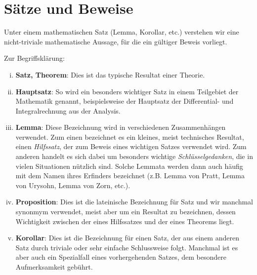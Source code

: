 \section{Sätze und Beweise}

Unter einem mathematischen Satz (Lemma, Korollar, etc.) verstehen wir eine nicht-triviale mathematische Aussage, für die ein gültiger Beweis vorliegt.

\begin{remark}
    Zur Begriffsklärung: 
    \begin{enumerate}[(i)]
        \item
        \textbf{Satz, Theorem}: Dies ist das typische Resultat einer Theorie.
        \item
        \textbf{Hauptsatz}: So wird ein besonders wichtiger Satz in einem Teilgebiet der Mathematik
        genannt, beispielsweise der Hauptsatz der Differential- und Integralrechnung aus der Analysis.
        \item
        \textbf{Lemma}:
        Diese Bezeichnung wird in verschiedenen Zusammenhängen verwendet. Zum einen bezeichnet es
        ein kleines, meist technisches Resultat, einen \textit{Hilfssatz}, der zum Beweis eines wichtigen
        Satzes verwendet wird. Zum anderen handelt es sich dabei um besonders wichtige \textit{Schlüsselgedanken},
        die in vielen Situationen nützlich sind. Solche Lemmata werden dann auch häufig mit dem Namen ihres Erfinders bezeichnet
        (z.B. Lemma von Pratt, Lemma von Urysohn, Lemma von Zorn, etc.).
        \item
        \textbf{Proposition}:
        Dies ist die lateinische Bezeichnung für Satz und wir manchmal synonmym verwendet,
        meist aber um ein Resultat zu bezeichnen, dessen Wichtigkeit zwischen der eines Hilfssatzes
        und der eines Theorems liegt.
        \item
        \textbf{Korollar}: 
        Dies ist die Bezeichnung für einen Satz, der aus einem anderen Satz durch triviale oder sehr einfache
        Schlussweise folgt. Manchmal ist es aber auch ein Spezialfall eines vorhergehenden Satzes, dem besondere Aufmerksamkeit gebührt.
    \end{enumerate}

\end{remark}

